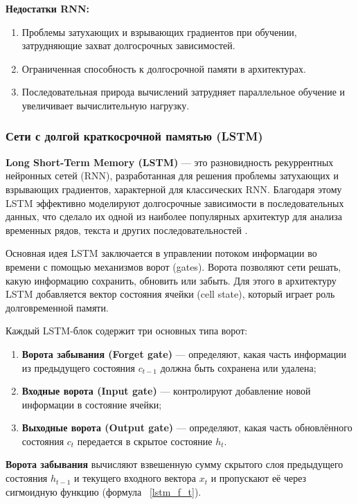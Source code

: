 \textbf{Недостатки RNN:}
\begin{enumerate}
    \item Проблемы затухающих и взрывающих градиентов при обучении, затрудняющие захват долгосрочных зависимостей.
    \item Ограниченная способность к долгосрочной памяти в архитектурах.
    \item Последовательная природа вычислений затрудняет параллельное обучение и увеличивает вычислительную нагрузку.
\end{enumerate}

\subsubsection{Сети с долгой краткосрочной памятью (LSTM)}

\textbf{Long Short-Term Memory (LSTM)} — это разновидность рекуррентных нейронных сетей (RNN), разработанная для решения проблемы затухающих и взрывающих градиентов, характерной для классических RNN. Благодаря этому LSTM эффективно моделируют долгосрочные зависимости в последовательных данных, что сделало их одной из наиболее популярных архитектур для анализа временных рядов, текста и других последовательностей \cite{LSTM}.

Основная идея LSTM заключается в управлении потоком информации во времени с помощью механизмов ворот (gates). Ворота позволяют сети решать, какую информацию сохранить, обновить или забыть. Для этого в архитектуру LSTM добавляется вектор состояния ячейки (cell state), который играет роль долговременной памяти.

Каждый LSTM-блок содержит три основных типа ворот:

\begin{enumerate}
    \item \textbf{Ворота забывания (Forget gate)} — определяют, какая часть информации из предыдущего состояния $c_{t-1}$ должна быть сохранена или удалена;
    \item \textbf{Входные ворота (Input gate)} — контролируют добавление новой информации в состояние ячейки;
    \item \textbf{Выходные ворота (Output gate)} — определяют, какая часть обновлённого состояния $c_t$ передается в скрытое состояние $h_t$.
\end{enumerate}

\textbf{Ворота забывания} вычисляют взвешенную сумму скрытого слоя предыдущего состояния $h_{t-1}$ и текущего входного вектора $x_t$ и пропускают её через сигмоидную функцию (формула ~\ref{lstm_f_t}).

